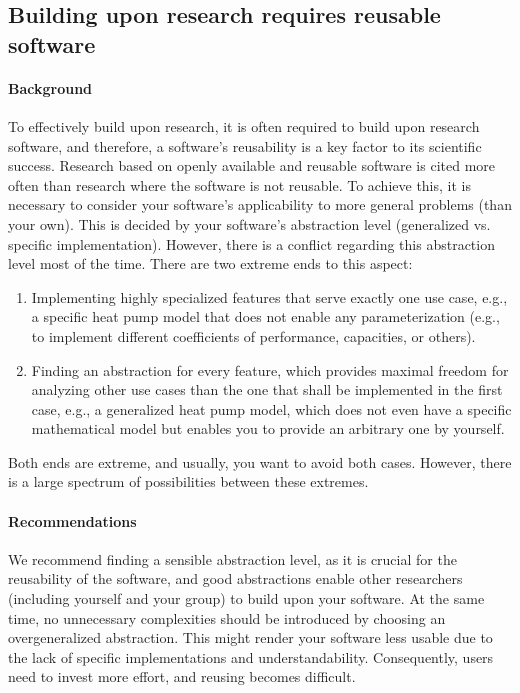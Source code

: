 \subsection{Building upon research requires reusable software}\label{sec:reuse}

\paragraph{Background} To effectively build upon research, it is often required to build upon research software, and therefore, a software's reusability is a key factor to its scientific success. Research based on openly available and reusable software is cited more often than research where the software is not reusable. To achieve this, it is necessary to consider your software's applicability to more general problems (than your own). This is decided by your software's abstraction level (generalized vs. specific implementation). However, there is a conflict regarding this abstraction level most of the time. There are two extreme ends to this aspect:
\begin{enumerate}
    \item Implementing highly specialized features that serve exactly one use case, e.g., a specific heat pump model that does not enable any parameterization (e.g., to implement different coefficients of performance, capacities, or others). 
    \item Finding an abstraction for every feature, which provides maximal freedom for analyzing other use cases than the one that shall be implemented in the first case, e.g., a generalized heat pump model, which does not even have a specific mathematical model but enables you to provide an arbitrary one by yourself.
\end{enumerate}
Both ends are extreme, and usually, you want to avoid both cases. However, there is a large spectrum of possibilities between these extremes. 

\paragraph{Recommendations} We recommend finding a sensible abstraction level, as it is crucial for the reusability of the software, and good abstractions enable other researchers (including yourself and your group) to build upon your software. At the same time, no unnecessary complexities should be introduced by choosing an overgeneralized abstraction. This might render your software less usable due to the lack of specific implementations and understandability. Consequently, users need to invest more effort, and reusing becomes difficult. 

